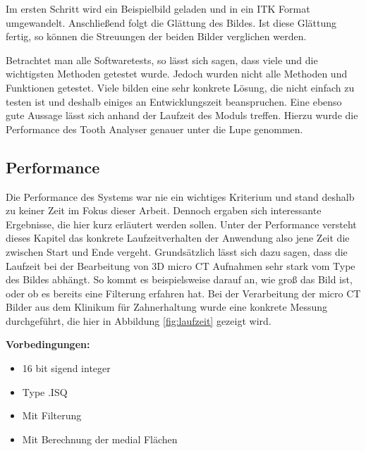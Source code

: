 Im ersten Schritt wird ein Beispielbild geladen und in ein \ac{ITK} Format umgewandelt.
Anschließend folgt die Glättung des Bildes. Ist diese Glättung fertig, so können
die Streuungen der beiden Bilder verglichen werden.

Betrachtet man alle Softwaretests, so lässt sich sagen, dass viele und die
wichtigsten Methoden getestet wurde. Jedoch wurden nicht alle Methoden und Funktionen
getestet. Viele bilden eine sehr konkrete Lösung, die nicht einfach zu testen ist
und deshalb einiges an Entwicklungszeit beanspruchen. Eine ebenso gute Aussage
lässt sich anhand der Laufzeit des Moduls treffen. Hierzu wurde die Performance des
Tooth Analyser genauer unter die Lupe genommen.

\pagebreak

\subsection{Performance}
Die Performance des Systems war nie ein wichtiges Kriterium und stand deshalb zu
keiner Zeit im Fokus dieser Arbeit. Dennoch ergaben sich interessante Ergebnisse,
die hier kurz erläutert werden sollen. Unter der Performance versteht dieses Kapitel
das konkrete Laufzeitverhalten der Anwendung also jene Zeit die zwischen Start und
Ende vergeht. Grundsätzlich lässt sich dazu sagen, dass die Laufzeit bei der Bearbeitung
von 3D micro CT Aufnahmen sehr stark vom Type des Bildes abhängt. So kommt es
beispielsweise darauf an, wie groß das Bild ist, oder ob es bereits eine
Filterung erfahren hat. Bei der Verarbeitung der micro CT Bilder aus dem Klinikum
für Zahnerhaltung wurde eine konkrete Messung durchgeführt, die hier in
Abbildung \ref{fig:laufzeit} gezeigt wird.

\textbf{Vorbedingungen:}
\begin{itemize}
	\item 16 bit sigend integer

	\item Type .ISQ

	\item Mit Filterung

	\item Mit Berechnung der medial Flächen
\end{itemize}

